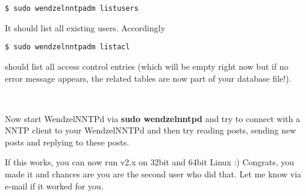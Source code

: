 \begin{verbatim}
$ sudo wendzelnntpadm listusers
\end{verbatim}

It should list all existing users. Accordingly

\begin{verbatim}
$ sudo wendzelnntpadm listacl
\end{verbatim}

should list all access control entries (which will be empty right now but if no error message appears, the related tables are now part of your database file!).

~

Now start WendzelNNTPd via \textbf{sudo wendzelnntpd} and try to connect with a NNTP client to your WendzelNNTPd and then try reading posts, sending new posts and replying to these posts.

If this works, you can now run v2.x on 32bit and 64bit Linux :) Congrats, you made it and chances are you are the second user who did that. Let me know via e-mail if it worked for you.
